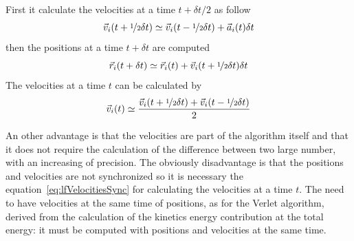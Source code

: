 First it calculate the velocities at a time $t+\delta t/2$ as follow
\begin{equation*}
	\vec v_i(t + \nicefrac{1}{2}\delta t) \simeq \vec v_i(t - \nicefrac{1}{2}\delta t) + \vec a_i(t)\delta t
\end{equation*}
then the positions at a time $t+\delta t$ are computed
\begin{equation*}
	\vec r_i(t + \delta t) \simeq \vec r_i(t) + \vec v_i(t + \nicefrac{1}{2}\delta t)\delta t
\end{equation*}
The velocities at a time $t$ can be calculated by
\begin{equation}
	\vec v_i(t) \simeq \frac{\vec v_i(t + \nicefrac{1}{2}\delta t) + \vec v_i(t - \nicefrac{1}{2}\delta t)}{2}
	\label{eq:lfVelocitiesSync}
\end{equation}

An other advantage is that the velocities are part of the algorithm itself and that it does not require the calculation of the difference between two large number, with an increasing of precision. The obviously disadvantage is that the positions and velocities are not synchronized so it is necessary the equation~\eqref{eq:lfVelocitiesSync} for calculating the velocities at a time $t$. The need to have velocities at the same time of positions, as for the Verlet algorithm, derived from the calculation of the kinetics energy contribution at the total energy: it must be computed with positions and velocities at the same time.

